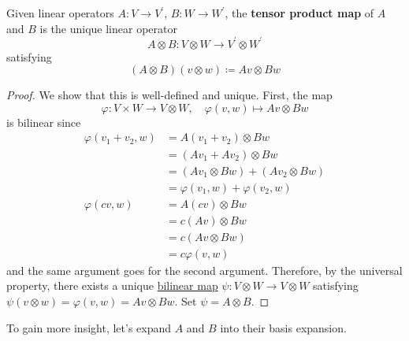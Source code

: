 	\begin{definition}
	  \label{def:tensor-product-of-linear-operators}
		Given linear operators $A: V \to V^\prime$, $B: W \to W^\prime$, the \textbf{tensor product map} of $A$ and $B$ is the unique linear operator  
		\begin{equation}
			A \otimes B: V \otimes W \to V^\prime \otimes W^\prime
		\end{equation} 
		satisfying 
		\begin{equation}
			(A \otimes B) (v \otimes w) \coloneqq A v \otimes B w
		\end{equation}
  \end{definition}
	\begin{proof}
	  We show that this is well-defined and unique. First, the map
		\begin{equation}
		  \varphi: V \times W \to V \otimes W, \quad \varphi(v, w) \mapsto Av \otimes Bw
		\end{equation}
		is bilinear since 
		\begin{align}
			\varphi(v_1 + v_2, w) & = A(v_1 + v_2) \otimes Bw \\ 
														& = (Av_1 + Av_2) \otimes Bw \\ 
														& = (Av_1 \otimes Bw) + (Av_2 \otimes Bw) \\ 
														& = \varphi(v_1, w) + \varphi(v_2, w) \\ 
			\varphi(cv, w) & = A(cv) \otimes Bw \\ 
										 & = c (Av) \otimes Bw \\ 
										 & = c (Av \otimes Bw) \\ 
										 & = c \varphi(v, w)
		\end{align}
		and the same argument goes for the second argument. Therefore, by the universal property, there exists a unique \hyperref[def:bilinear-map]{bilinear map} $\psi: V \otimes W \to V \otimes W$ satisfying $\psi(v \otimes w) = \varphi(v, w) = Av \otimes Bw$. Set $\psi = A \otimes B$. 
	\end{proof}

	To gain more insight, let's expand $A$ and $B$ into their basis expansion. 

